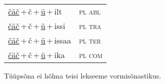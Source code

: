 \begin{minipage}{\textwidth}
\begin{sideways}
\begin{tabular}{l l}
\underline{čäč}\,+\,č\,+\,\underline{ü}\,+\,ilt & \textsc{ pl abl } \\
\underline{čäč}\,+\,č\,+\,\underline{ü}\,+\,issi & \textsc{ pl tra } \\
\underline{čäč}\,+\,č\,+\,\underline{ü}\,+\,issaa & \textsc{ pl ter } \\
\underline{čäč}\,+\,č\,+\,\underline{ü}\,+\,ika & \textsc{ pl com } \\
\end{tabular}
\end{sideways}
\label{tab:tüüpsõnamall-čäčüd}

\end{minipage}

 
\vspace{1em}
\noindent Tüüpsõna ei hõlma teisi lekseeme vormi\-sõnastikus.
